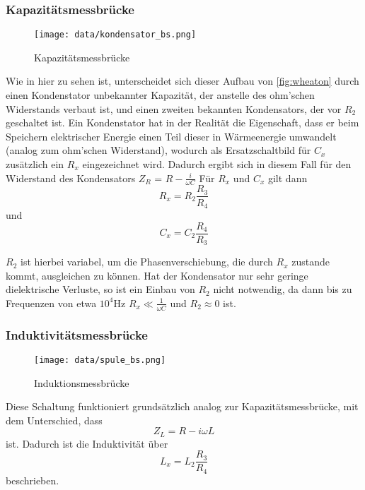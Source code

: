 \subsubsection{Kapazitätsmessbrücke}
\begin{figure}
\centering
\texttt{[image: data/kondensator\_bs.png]}
\caption{Kapazitätsmessbrücke}
\label{fig:kapa}
\end{figure}
Wie in hier zu sehen ist, unterscheidet sich dieser Aufbau von \ref{fig:wheaton} durch 
einen Kondenstator unbekannter Kapazität, der anstelle des ohm'schen Widerstands verbaut ist, und einen zweiten
bekannten Kondensators, der vor $R_2$ geschaltet ist. 
Ein Kondenstator hat in der 
Realität die Eigenschaft, dass er beim Speichern elektrischer Energie einen Teil dieser in Wärmeenergie umwandelt
(analog zum ohm'schen Widerstand),
wodurch als Ersatzschaltbild für $C_x$ zusätzlich ein $R_x$ eingezeichnet wird. 
Dadurch ergibt sich in diesem Fall für den Widerstand des Kondensators $ Z_R$ = $R - \frac{i}{\omega C}$
Für $R_x$ und $C_x$ gilt dann 
\begin{equation}
\label{eqn:kapa1}
  R_x = R_2 \frac{R_3}{R_4} 
\end{equation}
 \quad und
\begin{equation}
\label{eqn:kapa2}
   C_x = C_2 \frac{R_4}{R_3} 
\end{equation}


$R_2$ ist hierbei variabel, um die Phasenverschiebung, die durch $R_x$ zustande kommt, ausgleichen zu können.
Hat der Kondensator nur sehr geringe dielektrische Verluste, so ist ein Einbau von $R_2$ nicht notwendig, 
da dann bis zu Frequenzen von etwa $10^4\si{\hertz}$ $R_x \ll \frac{1}{\omega C}$ und 
$R_2 \approx 0$ ist.

\subsubsection{Induktivitätsmessbrücke}

\begin{figure}
\centering
\texttt{[image: data/spule\_bs.png]}
\caption{Induktionsmessbrücke}
\label{fig:spule}
\end{figure}
Diese Schaltung funktioniert grundsätzlich analog zur Kapazitätsmessbrücke, mit dem Unterschied, dass 
\begin{equation*}
    Z_L = R - i\omega L
\end{equation*}
ist. Dadurch ist die Induktivität über \begin{equation}
\label{eqn:induk}
    L_x = L_2 \frac{R_3}{R_4}
\end{equation} beschrieben.

